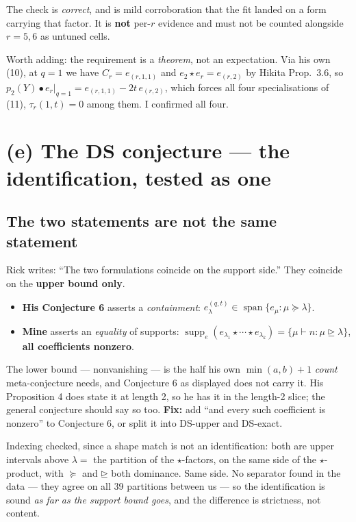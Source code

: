 \documentclass[11pt]{article}
\newcommand{\supp}{\operatorname{supp}}
\begin{document}
The check is \emph{correct}, and is mild corroboration that the fit landed on a form carrying
that factor. It is \textbf{not} per-$r$ evidence and must not be counted alongside $r=5,6$ as
untuned cells.

Worth adding: the requirement is a \emph{theorem}, not an expectation. Via his own (10), at
$q=1$ we have $C_r=e_{(r,1,1)}$ and $e_2\star e_r=e_{(r,2)}$ by Hikita Prop.\ 3.6, so
$p_2(Y)\bullet e_r|_{q=1}=e_{(r,1,1)}-2t\,e_{(r,2)}$, which forces all four specialisations of
(11), $\tau_r(1,t)=0$ among them. I confirmed all four.

\section{(e) The DS conjecture --- the identification, tested as one}
\subsection{The two statements are not the same statement}
Rick writes: ``The two formulations coincide on the support side.'' They coincide on the
\textbf{upper bound only}.
\begin{itemize}
\item \textbf{His Conjecture 6} asserts a \emph{containment}:
$e^{(q,t)}_\lambda\in\operatorname{span}\{e_\mu:\mu\succeq\lambda\}$.
\item \textbf{Mine} asserts an \emph{equality} of supports:
$\supp_e(e_{\lambda_1}\star\cdots\star e_{\lambda_k})=\{\mu\vdash n:\mu\unrhd\lambda\}$,
\textbf{all coefficients nonzero}.
\end{itemize}
The lower bound --- nonvanishing --- is the half his own $\min(a,b)+1$ \emph{count}
meta-conjecture needs, and Conjecture 6 as displayed does not carry it. His Proposition 4 does
state it at length 2, so he has it in the length-2 slice; the general conjecture should say so
too. \textbf{Fix:} add ``and every such coefficient is nonzero'' to Conjecture 6, or split it
into DS-upper and DS-exact.

Indexing checked, since a shape match is not an identification: both are upper intervals above
$\lambda=$ the partition of the $\star$-factors, on the same side of the $\star$-product, with
$\succeq$ and $\unrhd$ both dominance. Same side. No separator found in the data --- they agree
on all 39 partitions between us --- so the identification is sound \emph{as far as the support
bound goes}, and the difference is strictness, not content.
\end{document}
